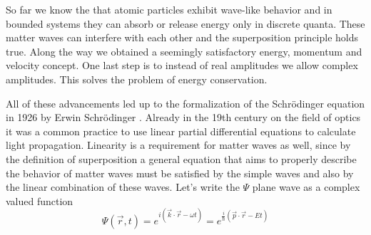 So far we know the that atomic particles exhibit wave-like behavior and in bounded systems they can absorb or release energy only in discrete quanta.
These matter waves can interfere with each other and the superposition principle holds true.
Along the way we obtained a seemingly satisfactory energy, momentum and velocity concept.
One last step is to instead of real amplitudes we allow complex amplitudes.
This solves the problem of energy conservation.

All of these advancements led up to the formalization of the Schrödinger equation in 1926 by Erwin Schrödinger \cite{schrodinger1926}.
Already in the 19th century on the field of optics it was a common practice to use linear partial differential equations to calculate light propagation.
Linearity is a requirement for matter waves as well, since by the definition of superposition a general equation that aims to properly describe the behavior of matter waves must be satisfied by the simple waves and also by the linear combination of these waves.
Let's write the $\Psi$ plane wave as a complex valued function
\begin{equation}
	\Psi(\vec{r}, t) = e^{i(\vec{k}\cdot\vec{r} - \omega t)} = e^{\frac{i}{\hbar}(\vec{p}\cdot\vec{r} - Et)}
\end{equation}

